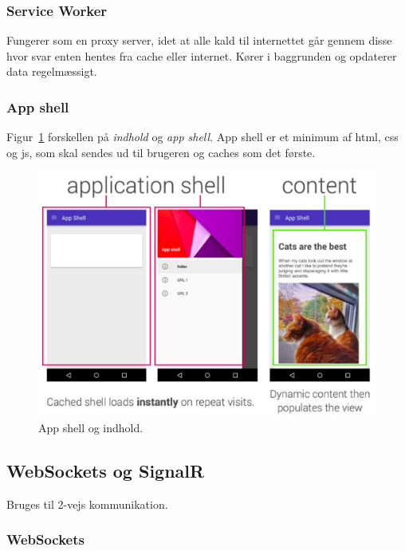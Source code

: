 \subsubsection{Service Worker}
Fungerer som en proxy server, idet at alle kald til internettet går gennem disse hvor svar enten hentes fra cache eller internet. Kører i baggrunden og opdaterer data regelmæssigt.

\subsubsection{App shell}
Figur~\ref{fig:app-shell} forskellen på \textit{indhold} og \textit{app shell}. App shell er et minimum af html, css og js, som skal sendes ud til brugeren og caches som det første.

\begin{figure}[H]
	\centering
	\includegraphics[width=\linewidth]{figs/spm3/app-shell}
	\caption{App shell og indhold.}
	\label{fig:app-shell}
\end{figure}

\subsection{WebSockets og SignalR}
Bruges til 2-vejs kommunikation.

\subsubsection{WebSockets}
